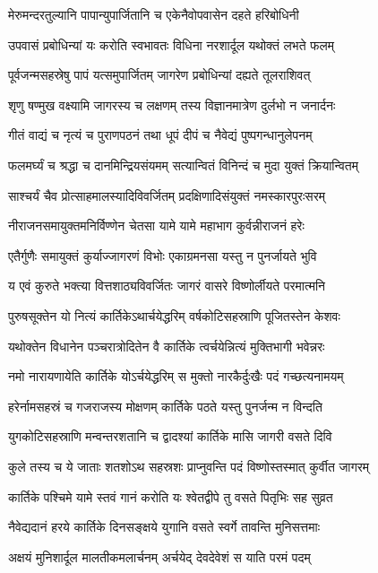 \twolineshloka
{मेरुमन्दरतुल्यानि पापान्युपार्जितानि च}
{एकेनैवोपवासेन दहते हरिबोधिनी} %

\twolineshloka
{उपवासं प्रबोधिन्यां यः करोति स्वभावतः}
{विधिना नरशार्दूल यथोक्तं लभते फलम्} %

\twolineshloka
{पूर्वजन्मसहस्रेषु पापं यत्समुपार्जितम्}
{जागरेण प्रबोधिन्यां दह्यते तूलराशिवत्} %

\twolineshloka
{शृणु षण्मुख वक्ष्यामि जागरस्य च लक्षणम्}
{तस्य विज्ञानमात्रेण दुर्लभो न जनार्दनः} %

\twolineshloka
{गीतं वाद्यं च नृत्यं च पुराणपठनं तथा}
{धूपं दीपं च नैवेद्यं पुष्पगन्धानुलेपनम्} %

\twolineshloka
{फलमर्घ्यं च श्रद्धा च दानमिन्द्रियसंयमम्}
{सत्यान्वितं विनिन्दं च मुदा युक्तं क्रियान्वितम्} %

\twolineshloka
{साश्चर्यं चैव प्रोत्साहमालस्यादिविवर्जितम्}
{प्रदक्षिणादिसंयुक्तं नमस्कारपुरःसरम्} %

\twolineshloka
{नीराजनसमायुक्तमनिर्विण्णेन चेतसा}
{यामे यामे महाभाग कुर्वन्नीराजनं हरेः} %

\twolineshloka
{एतैर्गुणैः समायुक्तं कुर्याज्जागरणं विभोः}
{एकाग्रमनसा यस्तु न पुनर्जायते भुवि} %

\twolineshloka
{य एवं कुरुते भक्त्या वित्तशाठ्यविवर्जितः}
{जागरं वासरे विष्णोर्लीयते परमात्मनि} %

\twolineshloka
{पुरुषसूक्तेन यो नित्यं कार्तिकेऽथार्चयेद्धरिम्}
{वर्षकोटिसहस्राणि पूजितस्तेन केशवः} %

\twolineshloka
{यथोक्तेन विधानेन पञ्चरात्रोदितेन वै}
{कार्तिके त्वर्चयेन्नित्यं मुक्तिभागी भवेन्नरः} %

\twolineshloka
{नमो नारायणायेति कार्तिके योऽर्चयेद्धरिम्}
{स मुक्तो नारकैर्दुःखैः पदं गच्छत्यनामयम्} %

\twolineshloka
{हरेर्नामसहस्रं च गजराजस्य मोक्षणम्}
{कार्तिके पठते यस्तु पुनर्जन्म न विन्दति} %

\twolineshloka
{युगकोटिसहस्राणि मन्वन्तरशतानि च}
{द्वादश्यां कार्तिके मासि जागरी वसते दिवि} %

\twolineshloka
{कुले तस्य च ये जाताः शतशोऽथ सहस्रशः}
{प्राप्नुवन्ति पदं विष्णोस्तस्मात् कुर्वीत जागरम्} %

\twolineshloka
{कार्तिके पश्चिमे यामे स्तवं गानं करोति यः}
{श्वेतद्वीपे तु वसते पितृभिः सह सुव्रत} %

\twolineshloka
{नैवेद्यदानं हरये कार्तिके दिनसङ्क्षये}
{युगानि वसते स्वर्गे तावन्ति मुनिसत्तमाः} %

\twolineshloka
{अक्षयं मुनिशार्दूल मालतीकमलार्चनम्}
{अर्चयेद् देवदेवेशं स याति परमं पदम्} %

